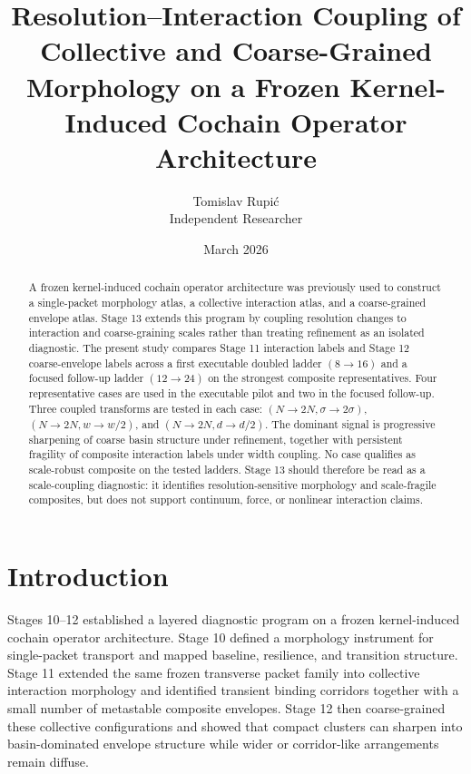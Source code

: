 \documentclass[11pt]{article}
\title{Resolution--Interaction Coupling of Collective and Coarse-Grained Morphology on a Frozen Kernel-Induced Cochain Operator Architecture}
\author{Tomislav Rupi\'c \\ Independent Researcher}
\date{March 2026}
\begin{document}
\maketitle

\begin{abstract}
A frozen kernel-induced cochain operator architecture was previously used to construct a single-packet morphology atlas, a collective interaction atlas, and a coarse-grained envelope atlas. Stage 13 extends this program by coupling resolution changes to interaction and coarse-graining scales rather than treating refinement as an isolated diagnostic. The present study compares Stage 11 interaction labels and Stage 12 coarse-envelope labels across a first executable doubled ladder $(8 \rightarrow 16)$ and a focused follow-up ladder $(12 \rightarrow 24)$ on the strongest composite representatives. Four representative cases are used in the executable pilot and two in the focused follow-up. Three coupled transforms are tested in each case: $(N \rightarrow 2N, \sigma \rightarrow 2\sigma)$, $(N \rightarrow 2N, w \rightarrow w/2)$, and $(N \rightarrow 2N, d \rightarrow d/2)$. The dominant signal is progressive sharpening of coarse basin structure under refinement, together with persistent fragility of composite interaction labels under width coupling. No case qualifies as scale-robust composite on the tested ladders. Stage 13 should therefore be read as a scale-coupling diagnostic: it identifies resolution-sensitive morphology and scale-fragile composites, but does not support continuum, force, or nonlinear interaction claims.
\end{abstract}

\section{Introduction}

Stages 10--12 established a layered diagnostic program on a frozen kernel-induced cochain operator architecture. Stage 10 defined a morphology instrument for single-packet transport and mapped baseline, resilience, and transition structure. Stage 11 extended the same frozen transverse packet family into collective interaction morphology and identified transient binding corridors together with a small number of metastable composite envelopes. Stage 12 then coarse-grained these collective configurations and showed that compact clusters can sharpen into basin-dominated envelope structure while wider or corridor-like arrangements remain diffuse.
\end{document}
